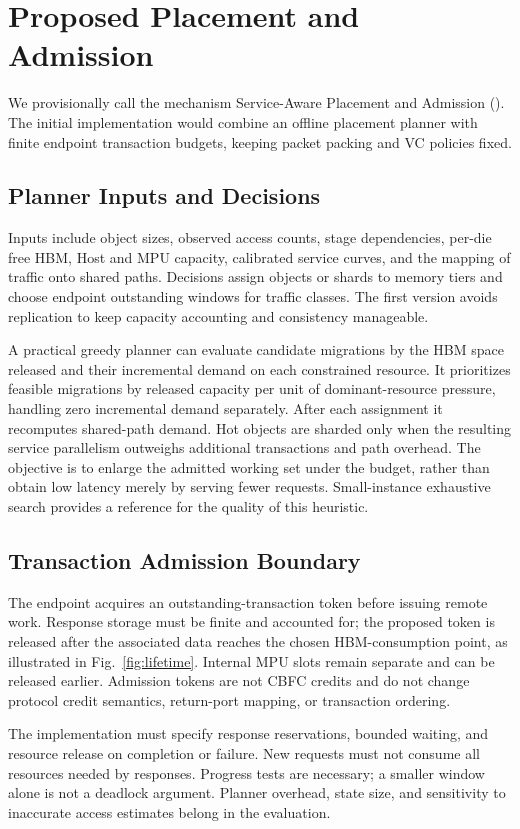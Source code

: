 \section{Proposed Placement and Admission}
We provisionally call the mechanism Service-Aware Placement and Admission
(\mechanism). The initial implementation would combine an offline
placement planner with finite endpoint transaction budgets, keeping
packet packing and VC policies fixed.

\subsection{Planner Inputs and Decisions}
Inputs include object sizes, observed access counts, stage dependencies,
per-die free HBM, Host and MPU capacity, calibrated service curves, and
the mapping of traffic onto shared paths. Decisions assign objects or
shards to memory tiers and choose endpoint outstanding windows for
traffic classes. The first version avoids replication to keep capacity
accounting and consistency manageable.

A practical greedy planner can evaluate candidate migrations by the HBM
space released and their incremental demand on each constrained resource.
It prioritizes feasible migrations by released capacity per unit of
dominant-resource pressure, handling zero incremental demand separately.
After each assignment it recomputes shared-path demand. Hot objects are
sharded only when the resulting service parallelism outweighs additional
transactions and path overhead. The objective is to enlarge the admitted
working set under the budget, rather than obtain low latency merely by
serving fewer requests. Small-instance exhaustive search provides a
reference for the quality of this heuristic.

\subsection{Transaction Admission Boundary}
The endpoint acquires an outstanding-transaction token before issuing
remote work. Response storage must be finite and accounted for; the
proposed token is released after the associated data reaches the chosen
HBM-consumption point, as illustrated in Fig.~\ref{fig:lifetime}.
Internal MPU slots remain separate and can be released earlier.
Admission tokens are not CBFC credits and do not change protocol credit
semantics, return-port mapping, or transaction ordering.

The implementation must specify response reservations, bounded waiting,
and resource release on completion or failure. New requests must not
consume all resources needed by responses. Progress tests are necessary;
a smaller window alone is not a deadlock argument. Planner overhead,
state size, and sensitivity to inaccurate access estimates belong in
the evaluation.

